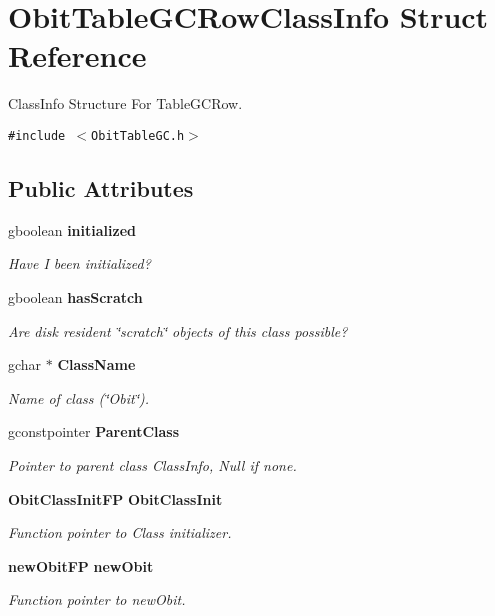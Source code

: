 \section{Obit\-Table\-GCRow\-Class\-Info Struct Reference}
\label{structObitTableGCRowClassInfo}
Class\-Info Structure For Table\-GCRow.  


{\tt \#include $<$Obit\-Table\-GC.h$>$}

\subsection*{Public Attributes}
\begin{CompactItemize}
\item 
gboolean {\bf initialized}
\begin{CompactList}\small\item\em Have I been initialized? \item\end{CompactList}\item 
gboolean {\bf has\-Scratch}
\begin{CompactList}\small\item\em Are disk resident \char`\"{}scratch\char`\"{} objects of this class possible? \item\end{CompactList}\item 
gchar $\ast$ {\bf Class\-Name}
\begin{CompactList}\small\item\em Name of class (\char`\"{}Obit\char`\"{}). \item\end{CompactList}\item 
gconstpointer {\bf Parent\-Class}
\begin{CompactList}\small\item\em Pointer to parent class Class\-Info, Null if none. \item\end{CompactList}\item 
{\bf Obit\-Class\-Init\-FP} {\bf Obit\-Class\-Init}
\begin{CompactList}\small\item\em Function pointer to Class initializer. \item\end{CompactList}\item 
{\bf new\-Obit\-FP} {\bf new\-Obit}
\begin{CompactList}\small\item\em Function pointer to new\-Obit. \item\end{CompactList}\item 

\end{CompactItemize}
